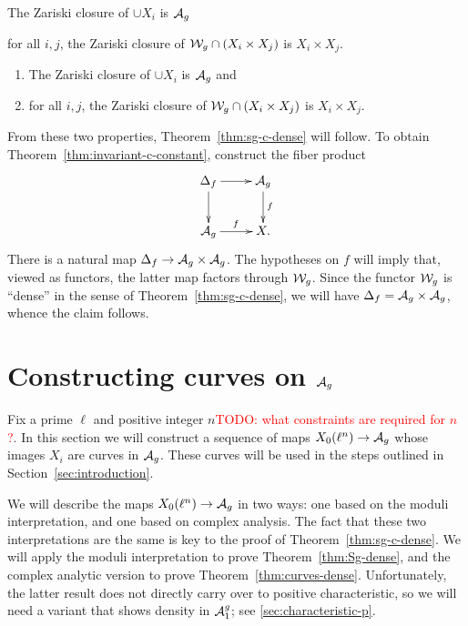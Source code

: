 \documentclass{amsart}
\begin{document}
\begin{theorem}\label{thm:curves-dense}
  The Zariski closure of ${\cup X_i}$ is $\mathcal{A}_g$
\end{theorem}

\begin{theorem}\label{thm:Sg-dense}
  for all $i,j$, the Zariski closure of $\mathcal{W}_g \cap (X_i \times X_j)$ is $X_i \times X_j$.
\end{theorem}
\begin{enumerate}
    \item\label{i:curves-dense} The Zariski closure of ${\cup X_i}$ is $\mathcal{A}_g$ and
    \item\label{i:Sg-dense} for all $i,j$, the Zariski closure of $\mathcal{W}_g \cap (X_i \times X_j)$ is $X_i \times X_j$.
\end{enumerate}
From these two properties, Theorem~\ref{thm:sg-c-dense} will follow. To obtain Theorem~\ref{thm:invariant-c-constant}, construct the fiber product
\[
  \xymatrix{
    \df \ar[r] \ar[d] & \ag \ar[d]^f \\
    \ag \ar[r]^f & X.
  }
\]
There is a natural map $\Delta_f \to \mathcal{A}_g \times \mathcal{A}_g$. The hypotheses on $f$ will imply that, viewed as functors, the latter map factors through $\mathcal{W}_g$. Since the functor $\mathcal{W}_g$ is ``dense'' in the sense of Theorem~\ref{thm:sg-c-dense}, we will have $\Delta_f = \mathcal{A}_g \times \mathcal{A}_g$, whence the claim follows.


\section{Constructing curves on $\mathcal{A}_g$}
\label{sec:curves-on-Ag}

Fix a prime $\ell$ and positive integer $n$\textcolor{red}{TODO: what constraints are required for $n$?}. In this section we will construct a sequence of maps $X_0(\ell^n) \to \mathcal{A}_g$ whose images $X_i$ are curves in $\mathcal{A}_g$. These curves will be used in the steps outlined in Section~\ref{sec:introduction}.

We will describe the maps $X_0(\ell^n) \to \mathcal{A}_g$ in two ways: one based on the moduli interpretation, and one based on complex analysis. The fact that these two interpretations are the same is key to the proof of Theorem~\ref{thm:sg-c-dense}. We will apply the moduli interpretation to prove Theorem~\ref{thm:Sg-dense}, and the complex analytic version to prove Theorem~\ref{thm:curves-dense}. Unfortunately, the latter result does not directly carry over to positive characteristic, so we will need a variant that shows density in $\mathcal{A}_1^g$; see \ref{sec:characteristic-p}.
\end{document}
